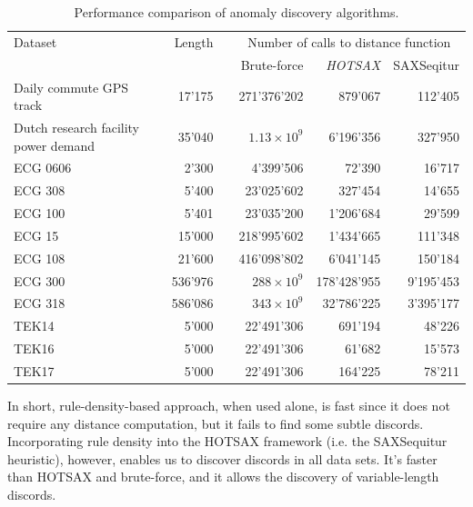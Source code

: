 \documentclass{llncs}
\begin{document}
\begin{footnotesize}
\begin{table}[t]
\vspace{-0.2cm}
\caption{Performance comparison of anomaly discovery algorithms.}
\label{perf_table}
\centering
\begin{tabularx}{\linewidth}{X r r r r r }
\hline
 Dataset & Length & & \multicolumn{3}{c}{Number of calls to distance function}\\ 
 \cline{4-6}
 &  & & Brute-force & \textit{HOTSAX}
& SAXSeqitur \\
\hline
\raggedright
Daily commute GPS track & 17'175 & & 271'376'202 & 879'067 & 112'405 \\
Dutch research facility power demand & 35'040 && $1.13 \times 10^{9}$ & 6'196'356 & 327'950\\
ECG 0606 & 2'300 & & 4'399'506 & 72'390 & 16'717 \\
ECG 308 & 5'400 & & 23'025'602 & 327'454 & 14'655 \\
ECG 100 & 5'401 & & 23'035'200 & 1'206'684 & 29'599 \\
ECG 15 & 15'000 & & 218'995'602 & 1'434'665 & 111'348 \\
ECG 108 & 21'600 & & 416'098'802 & 6'041'145 & 150'184 \\
ECG 300 & 536'976 & & $288 \times 10^{9}$ & 178'428'955 & 9'195'453 \\
ECG 318 & 586'086 & & $343 \times 10^{9}$ & 32'786'225 & 3'395'177 \\
TEK14 & 5'000 & & 22'491'306 & 691'194 & 48'226 \\
TEK16 & 5'000 & & 22'491'306 & 61'682 & 15'573 \\
TEK17 & 5'000 & & 22'491'306 & 164'225 & 78'211 \\
\hline
\end{tabularx}
   \vspace{-0.5cm}
\end{table}
\end{footnotesize}

In short, rule-density-based approach, when used alone, is fast since it does not require any distance computation, but it fails to find some subtle discords. Incorporating rule density into the HOTSAX framework (i.e. the SAXSequitur heuristic), however, enables us to discover discords in all data sets. It's faster than HOTSAX and brute-force, and it allows the discovery of variable-length discords. 
\end{document}
